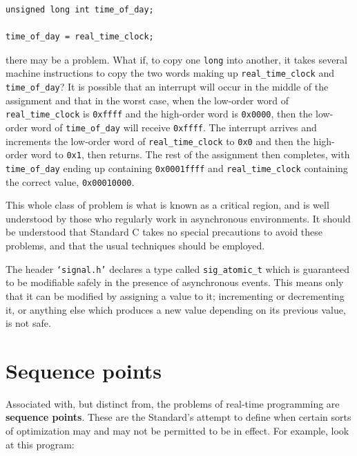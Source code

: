 \begin{Verbatim}
unsigned long int time_of_day;

time_of_day = real_time_clock;
\end{Verbatim}

    there may be a problem. What if, to copy one \texttt{long} into
     another, it takes several machine instructions to copy the two words
     making up \texttt{real\_time\_clock} and \texttt{time\_of\_day}? It
     is possible that an interrupt will occur in the middle of the
     assignment and that in the worst case, when the low-order word of
     \texttt{real\_time\_clock} is \texttt{0xffff} and the high-order
     word is \texttt{0x0000}, then the low-order word of
     \texttt{time\_of\_day} will receive \texttt{0xffff}. The
     interrupt arrives and increments the low-order word of
     \texttt{real\_time\_clock} to \texttt{0x0} and then the
     high-order word to \texttt{0x1}, then returns. The rest of the
     assignment then completes, with \texttt{time\_of\_day} ending up
     containing \texttt{0x0001ffff} and \texttt{real\_time\_clock}
     containing the correct value, \texttt{0x00010000}.


    This whole class of problem is what is known as a critical region,
     and is well understood by those who regularly work in asynchronous
     environments. It should be understood that Standard C takes no special
     precautions to avoid these problems, and that the usual techniques
     should be employed.


    The header \texttt{`signal.h'} declares a type called
     \texttt{sig\_atomic\_t} which is guaranteed to be modifiable safely
     in the presence of asynchronous events. This means only that it can be
     modified by assigning a value to it; incrementing or decrementing it,
     or anything else which produces a new value depending on its previous
     value, is not safe.


   

  

 
        \section{Sequence points}
        

  

  Associated with, but distinct from, the problems of real-time
   programming are \textbf{sequence points}. These are the Standard's
   attempt to define when certain sorts of optimization may and may not be
   permitted to be in effect. For example, look at this program:



